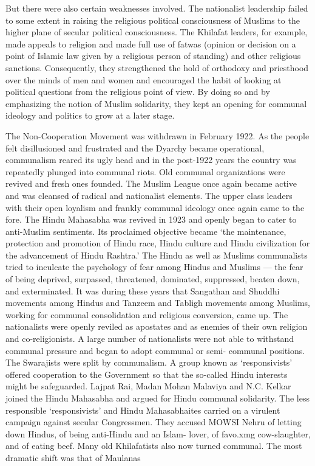 \begin{multicols}{2}
But there were also certain weaknesses involved. The nationalist leadership failed to some extent in raising the religious political consciousness of Muslims to the higher plane of secular political consciousness. The Khilafat leaders, for example, made appeals to religion and made full use of fatwas (opinion or decision on a point of Islamic law given by a religious person of standing) and other religious sanctions. Consequently, they strengthened the hold of orthodoxy and priesthood over the minds of men and women and encouraged the habit of looking at political questions from the religious point of view. By doing so and by emphasizing the notion of Muslim solidarity, they kept an opening for communal ideology and politics to grow at a later stage. 

The Non-Cooperation Movement was withdrawn in February 1922. As the people felt disillusioned and frustrated and the Dyarchy became operational, communalism reared its ugly head and in the post-1922 years the country was repeatedly plunged into communal riots. Old communal organizations were revived and fresh ones founded. The Muslim League once again became active and was cleansed of radical and nationalist elements. The upper class leaders with their open loyalism and frankly communal ideology once again came to the fore. The Hindu Mahasabha was revived in 1923 and openly began to cater to anti-Muslim sentiments. Its proclaimed objective became `the maintenance, protection and promotion of Hindu race, Hindu culture and Hindu civilization for the advancement of Hindu Rashtra.' The Hindu as well as Muslims communalists tried to inculcate the psychology of fear among Hindus and Muslims --- the fear of being deprived, surpassed, threatened, dominated, suppressed, beaten down, and exterminated. It was during these years that Sangathan and Shuddhi movements among Hindus and Tanzeem and Tabligh movements among Muslims, working for communal consolidation and religious conversion, came up. The nationalists were openly reviled as apostates and as enemies of their own religion and co-religionists. A large number of nationalists were not able to withstand communal pressure and began to adopt communal or semi- communal positions. The Swarajists were split by communalism. A group known as `responsivists' offered cooperation to the Government so that the so-called Hindu interests might be safeguarded. Lajpat Rai, Madan Mohan Malaviya and N.C. Kelkar joined the Hindu Mahasabha and argued for Hindu communal solidarity. The less responsible `responsivists' and Hindu Mahasabhaites carried on a virulent campaign against secular Congressmen. They accused MOWSI Nehru of letting down Hindus, of being anti-Hindu and an Islam- lover, of favo.xmg cow-slaughter, and of eating beef. Many old Khilafatists also now turned communal. The most dramatic shift was that of Maulanas 


\end{multicols}
